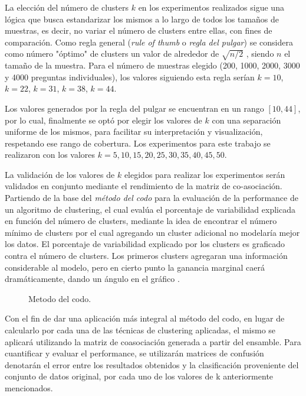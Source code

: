 La elección del número de clusters \(k\) en los experimentos realizados sigue una lógica que busca estandarizar los mismos a lo largo de todos los tamaños de muestras, es decir, no variar el número de clusters entre ellas, con fines de comparación. Como regla general (\textit{rule of thumb} o \textit{regla del pulgar}) se considera como número "óptimo" de clusters un valor de alrededor de \(\sqrt{n/2}\) \citep{kodinariya2013review}, siendo \(n\) el tamaño de la muestra. Para el número de muestras elegido (200, 1000, 2000, 3000 y 4000 preguntas individuales), los valores siguiendo esta regla serían \(k = 10\), \(k = 22\), \(k = 31\), \(k = 38\), \(k =44\).

\bigskip Los valores generados por la regla del pulgar se encuentran en un rango \([10, 44]\), por lo cual, finalmente se optó por elegir los valores de \(k\) con una separación uniforme de los mismos, para facilitar su interpretación y visualización, respetando ese rango de cobertura. Los experimentos para este trabajo se realizaron con los valores \(k = 5, 10, 15, 20, 25, 30, 35, 40, 45, 50\).

\bigskip La validación de los valores de \(k\) elegidos para realizar los experimentos serán validados en conjunto mediante el rendimiento de la matriz de co-asociación. Partiendo de la base del \textit{método del codo} para la evaluación de la performance de un algoritmo de clustering, el cual evalúa el porcentaje de variabilidad explicada en función del número de clusters, mediante la idea de encontrar el número mínimo de clusters por el cual agregando un cluster adicional no modelaría mejor los datos. El porcentaje de variabilidad explicado por los clusters es graficado contra el número de clusters. Los primeros clusters agregaran una información considerable al modelo, pero en cierto punto la ganancia marginal caerá dramáticamente, dando un ángulo en el gráfico \citep{bholowalia2014ebk}.

\begin{figure}
	\def\svgwidth{\linewidth}
	
	\caption{Metodo del codo.}
\end{figure}

\bigskip Con el fin de dar una aplicación más integral al método del codo, en lugar de calcularlo por cada una de las técnicas de clustering aplicadas, el mismo se aplicará utilizando la matriz de coasociación generada a partir del ensamble. Para cuantificar y evaluar el performance, se utilizarán matrices de confusión denotarán el error entre los resultados obtenidos y la clasificación proveniente del conjunto de datos original, por cada uno de los valores de k anteriormente mencionados.

